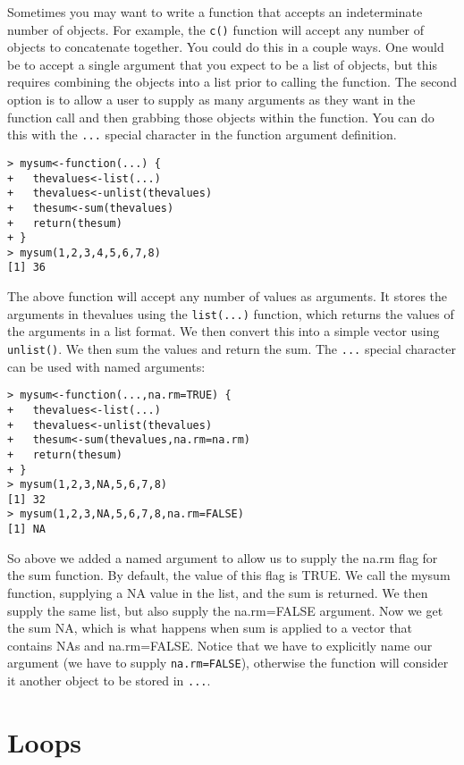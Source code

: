 \documentclass[12pt, oneside]{amsart}   	%
\begin{document}
Sometimes you may want to write a function that accepts an indeterminate number of objects. For example, the \texttt{c()} function will accept any number of objects to concatenate together. You could do this in a couple ways. One would be to accept a single argument that you expect to be a list of objects, but this requires combining the objects into a list prior to calling the function. The second option is to allow a user to supply as many arguments as they want in the function call and then grabbing those objects within the function. You can do this with the \texttt{...} special character in the function argument definition.

\begin{verbatim}
> mysum<-function(...) {
+   thevalues<-list(...)
+   thevalues<-unlist(thevalues)
+   thesum<-sum(thevalues)
+   return(thesum)
+ }
> mysum(1,2,3,4,5,6,7,8)
[1] 36
\end{verbatim}

The above function will accept any number of values as arguments. It stores the arguments in thevalues using the \texttt{list(...)} function, which returns the values of the arguments in a list format. We then convert this into a simple vector using \texttt{unlist()}. We then sum the values and return the sum. The \texttt{...} special character can be used with named arguments:

\begin{verbatim}
> mysum<-function(...,na.rm=TRUE) {
+   thevalues<-list(...)
+   thevalues<-unlist(thevalues)
+   thesum<-sum(thevalues,na.rm=na.rm)
+   return(thesum)
+ }
> mysum(1,2,3,NA,5,6,7,8)
[1] 32
> mysum(1,2,3,NA,5,6,7,8,na.rm=FALSE)
[1] NA
\end{verbatim}

So above we added a named argument to allow us to supply the na.rm flag for the sum function. By default, the value of this flag is TRUE. We call the mysum function, supplying a NA value in the list, and the sum is returned. We then supply the same list, but also supply the na.rm=FALSE argument. Now we get the sum NA, which is what happens when sum is applied to a vector that contains NAs and na.rm=FALSE. Notice that we have to explicitly name our argument (we have to supply \texttt{na.rm=FALSE}), otherwise the function will consider it another object to be stored in \texttt{...}. 

\section{Loops}
\end{document}
